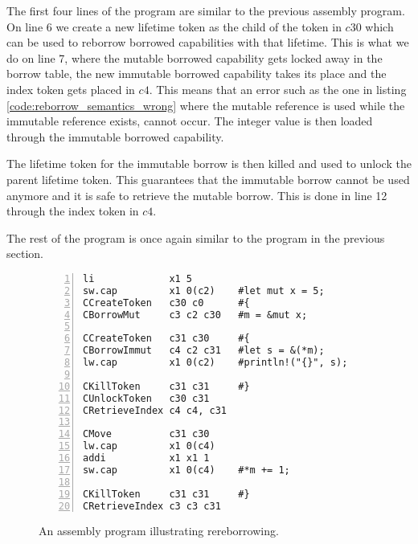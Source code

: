 The first four lines of the program are similar to the previous assembly program.
On line 6 we create a new lifetime token as the child of the token in $c30$ which can be used to reborrow borrowed capabilities with that lifetime.
This is what we do on line 7, where the mutable borrowed capability gets locked away in the borrow table, the new immutable borrowed capability takes its place and the index token gets placed in $c4$.
This means that an error such as the one in listing \ref{code:reborrow_semantics_wrong} where the mutable reference is used while the immutable reference exists, cannot occur.
The integer value is then loaded through the immutable borrowed capability.

The lifetime token for the immutable borrow is then killed and used to unlock the parent lifetime token.
This guarantees that the immutable borrow cannot be used anymore and it is safe to retrieve the mutable borrow.
This is done in line 12 through the index token in $c4$.

The rest of the program is once again similar to the program in the previous section.
\begin{figure}[h]
\begin{lstlisting}[style=custASM, numbers = left ,xleftmargin=1.5em]
li             x1 5
sw.cap         x1 0(c2)    #let mut x = 5;
CCreateToken   c30 c0      #{
CBorrowMut     c3 c2 c30   #m = &mut x;

CCreateToken   c31 c30     #{
CBorrowImmut   c4 c2 c31   #let s = &(*m);
lw.cap         x1 0(c2)    #println!("{}", s);

CKillToken     c31 c31     #}
CUnlockToken   c30 c31
CRetrieveIndex c4 c4, c31

CMove          c31 c30
lw.cap         x1 0(c4)
addi           x1 x1 1
sw.cap         x1 0(c4)    #*m += 1;

CKillToken     c31 c31     #}
CRetrieveIndex c3 c3 c31
\end{lstlisting}
\caption{An assembly program illustrating rereborrowing.}
\label{fig:asmreborrowexample}
\end{figure}

